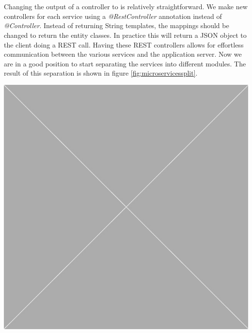 \documentclass[12pt]{article}
\newenvironment{Figure}
	{\par\medskip\noindent\minipage{\linewidth}}
	{\endminipage\par\medskip}
\begin{document}
\begin{multicols}{2}
\\\\
Changing the output of a controller to is relatively straightforward. We make new controllers for each service using a \textit{@RestController} annotation instead of \textit{@Controller}. Instead of returning String templates, the mappings should be changed to return the entity classes. In practice this will return a JSON object to the client doing a REST call. Having these REST controllers allows for effortless communication between the various services and the application server. Now we are in a good position to start separating the services into different modules. The result of this separation is shown in figure \ref{fig:microservicessplit}.
\begin{Figure}
	\centering
	\includegraphics[width=0.9\linewidth]{illustrations/placeholder.jpg}
	\label{fig:microservicessplit}
\end{Figure}

\end{multicols}
\end{document}
